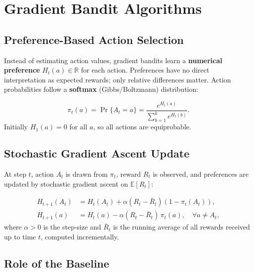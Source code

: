 \documentclass[11pt,a4paper]{article}
\theoremstyle{definition}
\theoremstyle{plain}
\theoremstyle{remark}
\begin{document}
\section{Gradient Bandit Algorithms}

\subsection{Preference-Based Action Selection}

Instead of estimating action values, gradient bandits learn a \textbf{numerical preference} $H_t(a) \in \mathbb{R}$ for each action. Preferences have no direct interpretation as expected rewards; only relative differences matter. Action probabilities follow a \textbf{softmax} (Gibbs/Boltzmann) distribution:

\begin{tcolorbox}[colback=blue!5!white,colframe=blue!75!black,title=\textbf{Softmax Action Probabilities}]
\[
    \pi_t(a) = \Pr\{A_t = a\} = \frac{e^{H_t(a)}}{\displaystyle\sum_{b=1}^{k} e^{H_t(b)}}.
\]
Initially $H_1(a) = 0$ for all $a$, so all actions are equiprobable.
\end{tcolorbox}

\subsection{Stochastic Gradient Ascent Update}

At step $t$, action $A_t$ is drawn from $\pi_t$, reward $R_t$ is observed, and preferences are updated by stochastic gradient ascent on $\mathbb{E}[R_t]$:

\begin{tcolorbox}[colback=blue!5!white,colframe=blue!75!black,title=\textbf{Gradient Bandit Update}]
\begin{align*}
    H_{t+1}(A_t) &= H_t(A_t) + \alpha(R_t - \bar{R}_t)(1 - \pi_t(A_t)), \\
    H_{t+1}(a)   &= H_t(a)   - \alpha(R_t - \bar{R}_t)\,\pi_t(a), \quad \forall a \neq A_t,
\end{align*}
where $\alpha > 0$ is the step-size and $\bar{R}_t$ is the running average of all rewards received up to time $t$, computed incrementally.
\end{tcolorbox}

\subsection{Role of the Baseline}
\end{document}
